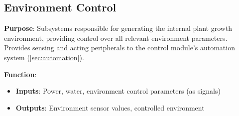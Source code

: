 \documentclass{../tex/report}
\begin{document}
\newpage

\subsection{Environment Control}
\label{sec:environment}

\textbf{Purpose}: Subsystems responsible for generating the internal plant growth environment, providing control over all relevant environment parameters. Provides sensing and acting peripherals to the control module's automation system (\ref{sec:automation}).

\textbf{Function}:
\begin{itemize}
    \item \textbf{Inputs}: Power, water, environment control parameters (as signals)
    \item \textbf{Outputs}: Environment sensor values, controlled environment
\end{itemize}
\end{document}
